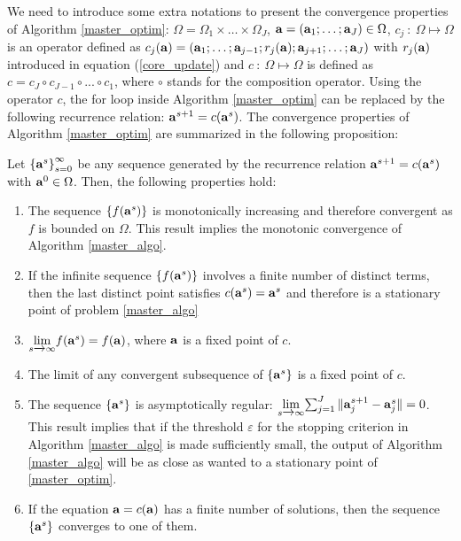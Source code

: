 \documentclass[
]{jss}
\begin{document}
We need to introduce some extra notations to present the convergence
properties of Algorithm \ref{master_optim}:
\(\Omega = \Omega_1 \times \ldots \times \Omega_J\),
\(\mathbf{a} = \left(\mathbf{a}_1; \ldots;\mathbf{a}_J\right) \in \Omega\),
\(c_j~:~\Omega\mapsto\Omega\) is an operator defined as
\(c_j(\mathbf{a}) = \left(\mathbf{a}_1; \ldots; \mathbf{a}_{j-1} ; r_j(\mathbf{a}) ; \mathbf{a}_{j+1} ; \ldots; \mathbf{a}_J\right)\)
with \(r_j(\mathbf{a})\) introduced in equation (\ref{core_update}) and
\(c~:~\Omega\mapsto\Omega\) is defined as
\(c = c_J\circ c_{J-1}\circ ... \circ c_1\), where \(\circ\) stands for
the composition operator. Using the operator \(c\), the
\guillemotleft for loop\guillemotright{} inside Algorithm
\ref{master_optim} can be replaced by the following recurrence relation:
\(\mathbf{a}^{s+1} = c(\mathbf{a}^s)\). The convergence properties of Algorithm
\ref{master_optim} are summarized in the following proposition:

\begin{proposition}
    Let $\left\lbrace \mathbf{a}^s\right\rbrace_{s=0}^{\infty}$ be any sequence 
    generated by the recurrence relation $\mathbf{a}^{s+1} = c(\mathbf{a}^s)$ with 
    $\mathbf{a}^0\in\Omega$. Then, the following properties hold:
    \begin{enumerate}[topsep=0pt,itemsep=-0.75ex,partopsep=1ex,parsep=1ex, label = {(\alph*)}]
        \item  \label{prop_pt1} The sequence $\left\lbrace f(\mathbf{a}^s)\right\rbrace $ is monotonically increasing and therefore convergent as $f$ is bounded on $\Omega$. This result implies the monotonic convergence of Algorithm \ref{master_algo}.
        \item  \label{prop_pt2} If the infinite sequence $\left\lbrace f(\mathbf{a}^s)\right\rbrace $ involves a finite number of distinct terms, then the last distinct point satisfies $c(\mathbf{a}^s) = \mathbf{a}^s$ and therefore is a stationary point of problem \ref{master_algo} 
    \item  \label{prop_pt3} $\underset{s\xrightarrow[]{}\infty}\lim{f(\ensuremath{\mathbf{a}}^s) = f(\ensuremath{\mathbf{a}})}$, where $\mathbf{a}$ is a fixed point of $c$.
        \item  \label{prop_pt4} The limit of any convergent subsequence of $\left\lbrace \mathbf{a}^s\right\rbrace $ is a fixed point of $c$.
        \item  \label{prop_pt5} The sequence $\left\lbrace \mathbf{a}^s \right\rbrace $ is asymptotically regular: $\underset{s\xrightarrow[]{}\infty}\lim{\sum_{j=1}^{J} \Vert \ensuremath{\mathbf{a}}_j^{s+1} - \ensuremath{\mathbf{a}}_j^s \Vert} = 0$. This result implies that if the threshold $\varepsilon$ for the stopping criterion in Algorithm \ref{master_algo} is made sufficiently small, the output of Algorithm \ref{master_algo} will be as close as wanted to a stationary point of \ref{master_optim}. 
        \item  \label{prop_pt6} If the equation $\mathbf{a} = c(\mathbf{a})$ has a finite number of solutions, then the sequence $\left\lbrace \mathbf{a}^s\right\rbrace $ converges to one of them.
    \end{enumerate}
    \label{cv_prop}
\end{proposition}
\end{document}
